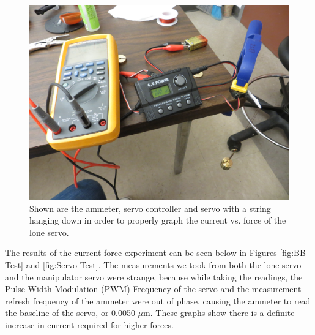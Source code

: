 \documentclass[12pt,onecolumn]{report}
\begin{document}
\begin{figure}[ht]
\begin{center}
\includegraphics[width=.5\linewidth]{./Figs/full_servotest.jpg}
\end{center}
\caption{Shown are the ammeter, servo controller and servo with a string hanging down in order to properly graph the current vs. force of the lone servo.}
\label{fig:experiment}
\end{figure}

The results of the current-force experiment can be seen below in Figures \ref{fig:BB Test} and \ref{fig:Servo Test}. The measurements we took from both the lone servo and the manipulator servo were strange, because while taking the readings, the Pulse Width Modulation (PWM) Frequency of the servo and the measurement refresh frequency of the ammeter were out of phase, causing the ammeter to read the baseline of the servo, or 0.0050 $\mu$m. These graphs show there is a definite increase in current required for higher forces. 
\end{document}
